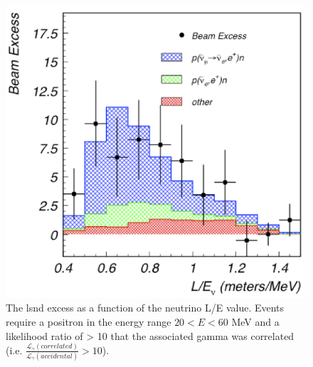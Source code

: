 \begin{figure}[h]
    \centering
    \includegraphics[width = \largefigwidth]{figures-chap2/LSND_excess.png}
    \caption{The \gls{lsnd} excess as a function of the neutrino L/E value. Events require a positron in the energy range $20 < E < 60$ MeV and a likelihood ratio of > 10 that the associated gamma was correlated (i.e. $\frac{\mathcal{L}_{\gamma}(correlated)}{\mathcal{L}_{\gamma}(accidental)} > 10$). \cite{LSND_excess}}
    \label{fig:LSND excess}
\end{figure}
\newpage

